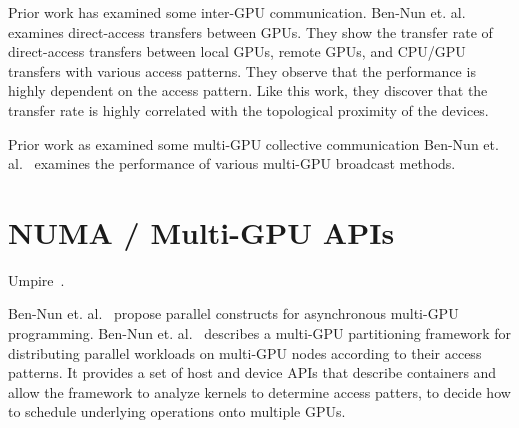 Prior work has examined some inter-GPU communication.
Ben-Nun et. al.~\cite{ben2017groute} examines direct-access transfers between GPUs.
They show the transfer rate of direct-access transfers between local GPUs, remote GPUs, and CPU/GPU transfers with various access patterns.
They observe that the performance is highly dependent on the access pattern.
Like this work, they discover that the transfer rate is highly correlated with the topological proximity of the devices.

Prior work as examined some multi-GPU collective communication
Ben-Nun et. al.~\cite{ben2017groute} examines the performance of various multi-GPU broadcast methods.

\section{NUMA / Multi-GPU APIs}

Umpire~\cite{beckingsale2018umpire}.

Ben-Nun et. al.~\cite{ben2017groute} propose parallel constructs for asynchronous multi-GPU programming.
Ben-Nun et. al.~\cite{ben2015memory} describes a multi-GPU partitioning framework for distributing parallel workloads on multi-GPU nodes according to their access patterns.
It provides a set of host and device APIs that describe containers and allow the framework to analyze kernels to determine access patters, to decide how to schedule underlying operations onto multiple GPUs.

